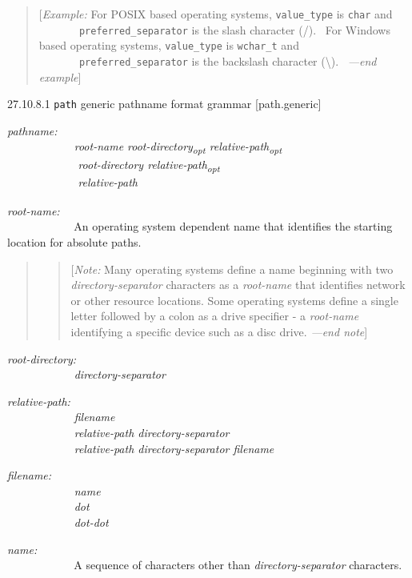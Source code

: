 \begin{quote}
{[}\emph{Example:} For POSIX based operating systems,
\texttt{value\_type} is \texttt{char} and
\texttt{\ \ \ \ \ \ \ preferred\_separator} is the slash character (/).~
For Windows based operating systems, \texttt{value\_type} is
\texttt{wchar\_t} and \texttt{\ \ \ \ \ \ \ preferred\_separator} is the
backslash character (\textbackslash{}).~ \emph{---end example}{]}
\end{quote}

27.10.8.1 \texttt{path} generic pathname format grammar
{[}path.generic{]}

\emph{pathname:\\
 ~~~~~~~~~~~ root-name root-directory\textsubscript{opt}
relative-path\textsubscript{opt\\
 ~~~~~~~~~~~~~~} root-directory relative-path\textsubscript{opt\\
 ~~~~~~~~~~~~~~} relative-path}

\emph{root-name:\\
 ~~~~~~~~~~~} An operating system dependent name that identifies the
starting location for absolute paths.

\begin{quote}
\begin{quote}
{[}\emph{Note:} Many operating systems define a name beginning with two
\emph{directory-separator} characters as a \emph{root-name} that
identifies network or other resource locations. Some operating systems
define a single letter followed by a colon as a drive specifier - a
\emph{root-name} identifying a specific device such as a disc drive.
\emph{---end note}{]}
\end{quote}
\end{quote}

\emph{root-directory:\\
 ~~~~~~~~~~~ directory-separator}

\emph{relative-path:\\
 ~~~~~~~~~~~ filename\\
 ~~~~~~~~~~~ relative-path directory-separator\\
 ~~~~~~~~~~~ relative-path directory-separator filename}

\emph{filename:\\
 ~~~~~~~~~~~ name\\
 ~~~~~~~~~~~ dot\\
 ~~~~~~~~~~~ dot-dot}

\emph{name:\\
 ~~~~~~~~~~~} A sequence of characters other than
\emph{directory-separator} characters.

